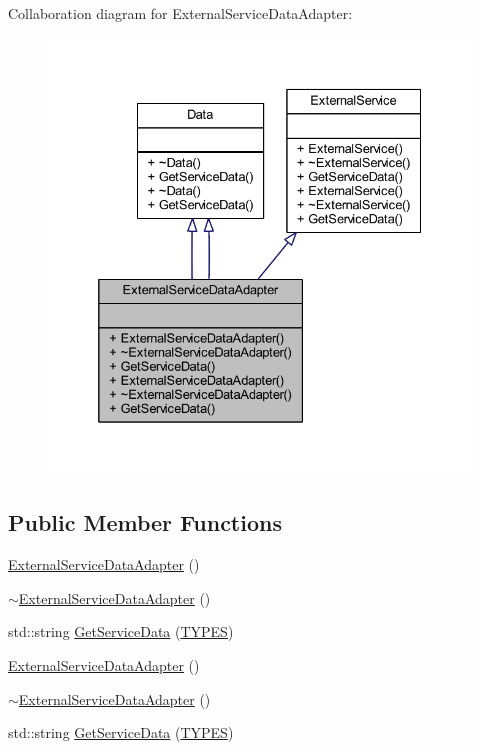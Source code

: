 Collaboration diagram for External\+Service\+Data\+Adapter\+:
\nopagebreak
\begin{figure}[H]
\begin{center}
\leavevmode
\includegraphics[width=332pt]{class_external_service_data_adapter__coll__graph}
\end{center}
\end{figure}
\subsection*{Public Member Functions}
\begin{DoxyCompactItemize}
\item 
\mbox{\hyperlink{class_external_service_data_adapter_a65b8464a5fa3a38424ca29215424c749}{External\+Service\+Data\+Adapter}} ()
\item 
\mbox{\hyperlink{class_external_service_data_adapter_a580d0c8f5d86073248afa2a033f1b69c}{$\sim$\+External\+Service\+Data\+Adapter}} ()
\item 
std\+::string \mbox{\hyperlink{class_external_service_data_adapter_aef7b123ab3e636ec263b609dae8bc4e7}{Get\+Service\+Data}} (\mbox{\hyperlink{_class_adapter_2_class_adapter_2_data_8h_aacb79576e5cf053ee9c93cb9d665e32b}{T\+Y\+P\+ES}})
\item 
\mbox{\hyperlink{class_external_service_data_adapter_a65b8464a5fa3a38424ca29215424c749}{External\+Service\+Data\+Adapter}} ()
\item 
\mbox{\hyperlink{class_external_service_data_adapter_a580d0c8f5d86073248afa2a033f1b69c}{$\sim$\+External\+Service\+Data\+Adapter}} ()
\item 
std\+::string \mbox{\hyperlink{class_external_service_data_adapter_aef7b123ab3e636ec263b609dae8bc4e7}{Get\+Service\+Data}} (\mbox{\hyperlink{_class_adapter_2_class_adapter_2_data_8h_aacb79576e5cf053ee9c93cb9d665e32b}{T\+Y\+P\+ES}})
\end{DoxyCompactItemize}


